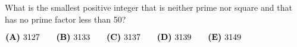 

What is the smallest positive integer that is neither prime nor square and that has no prime factor less than 50?

$\textbf{(A)}\hspace{.05in}3127 \qquad \textbf{(B)}\hspace{.05in}3133 \qquad \textbf{(C)}\hspace{.05in}3137 \qquad \textbf{(D)}\hspace{.05in}3139 \qquad \textbf{(E)}\hspace{.05in}3149 $
